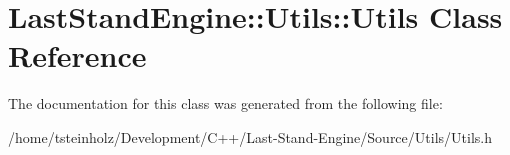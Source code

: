 \hypertarget{classLastStandEngine_1_1Utils_1_1Utils}{}\section{Last\+Stand\+Engine\+:\+:Utils\+:\+:Utils Class Reference}
\label{classLastStandEngine_1_1Utils_1_1Utils}


The documentation for this class was generated from the following file\+:\begin{DoxyCompactItemize}
\item 
/home/tsteinholz/\+Development/\+C++/\+Last-\/\+Stand-\/\+Engine/\+Source/\+Utils/Utils.\+h\end{DoxyCompactItemize}
